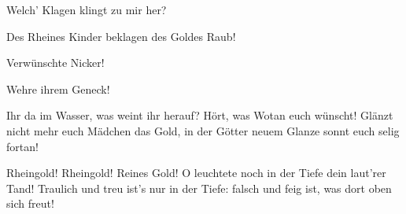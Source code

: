 \begin{drama}
Welch' Klagen klingt zu mir her?
 

\Logespeaks


Des Rheines Kinder beklagen des Goldes Raub!
 

\Wotanspeaks
Verwünschte Nicker!
 



Wehre ihrem Geneck!
 

\Logespeaks


Ihr da im Wasser, was weint ihr herauf?
Hört, was Wotan euch wünscht!
Glänzt nicht mehr euch Mädchen das Gold,
in der Götter neuem Glanze
sonnt euch selig fortan!
 






Rheingold! Rheingold! Reines Gold!
O leuchtete noch in der Tiefe dein laut'rer Tand!
Traulich und treu ist's nur in der Tiefe:
falsch und feig ist, was dort oben sich freut!
 




\end{drama}